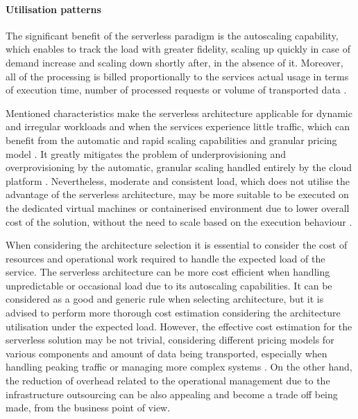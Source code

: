 \paragraph{Utilisation patterns} \label{chapter:serverless-suitability-utilisation-patterns}

The significant benefit of the serverless paradigm is the autoscaling capability, which enables to track the load with greater fidelity, scaling up quickly in case of demand increase and scaling down shortly after, in the absence of it.
Moreover, all of the processing is billed proportionally to the services actual usage in terms of execution time, number of processed requests or volume of transported data \cite{BerkeleyServerless}.

Mentioned characteristics make the serverless architecture applicable for dynamic and irregular workloads and when the services experience little traffic, which can benefit from the automatic and rapid scaling capabilities and granular pricing model \cite{EvaluationOfServerlessApplicationProgrammingModel}.
It greatly mitigates the problem of underprovisioning and overprovisioning by the automatic, granular scaling handled entirely by the cloud platform \cite{MartinFowlerServerless}.
Nevertheless, moderate and consistent load, which does not utilise the advantage of the serverless architecture, may be more suitable to be executed on the dedicated virtual machines or containerised environment due to lower overall cost of the solution, without the need to scale based on the execution behaviour \cite{LeveragingServerlessCloudComputingArchitectures}.

When considering the architecture selection it is essential to consider the cost of resources and operational work required to handle the expected load of the service.
The serverless architecture can be more cost efficient when handling unpredictable or occasional load due to its autoscaling capabilities. It can be considered as a good and generic rule when selecting architecture, but it is advised to perform more thorough cost estimation considering the architecture utilisation under the expected load.
However, the effective cost estimation for the serverless solution may be not trivial, considering different pricing models for various components and amount of data being transported, especially when handling peaking traffic or managing more complex systems \cite{EvaluationOfServerlessApplicationProgrammingModel}.
On the other hand, the reduction of overhead related to the operational management due to the infrastructure outsourcing can be also appealing and become a trade off being made, from the business point of view.

